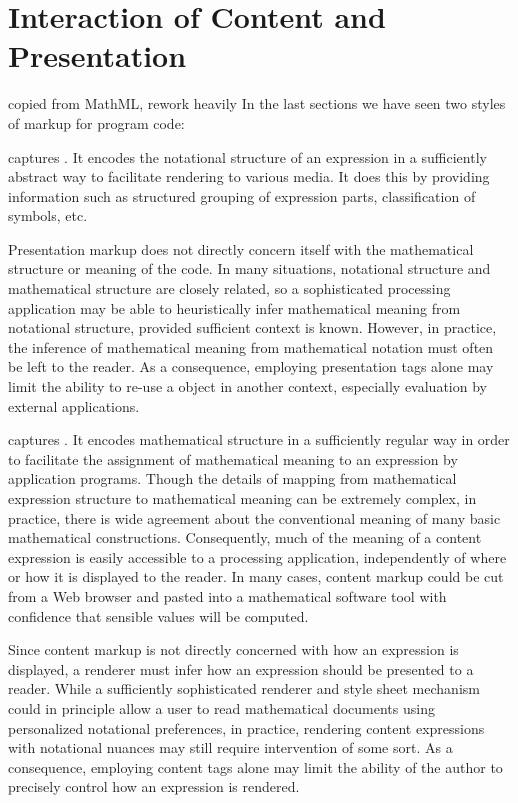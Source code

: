 \section{Interaction of Content and Presentation}\label{sec:integration}

\begin{newpart}{copied from MathML, rework heavily}
In the last sections we have seen two styles of markup for program code: 

{\em {}} captures
{}. It encodes the
notational structure of an expression in a sufficiently abstract way to facilitate
rendering to various media. It does this by providing information such as
structured grouping of expression parts, classification of symbols, etc.

Presentation markup does not directly concern itself with the mathematical
structure or meaning of the code. In many situations, notational structure and
mathematical structure are closely related, so a sophisticated processing
application may be able to heuristically infer mathematical meaning from
notational structure, provided sufficient context is known. However, in practice,
the inference of mathematical meaning from mathematical notation must often be
left to the reader. As a consequence, employing presentation tags alone may limit
the ability to re-use a {\codeml} object in another context, especially evaluation
by external applications.

{\em {}} captures {}. It encodes mathematical structure
in a sufficiently regular way in order to facilitate the assignment of
mathematical meaning to an expression by application programs.  Though the details
of mapping from mathematical expression structure to mathematical meaning can be
extremely complex, in practice, there is wide agreement about the conventional
meaning of many basic mathematical constructions.  Consequently, much of the
meaning of a content expression is easily accessible to a processing application,
independently of where or how it is displayed to the reader. In many cases,
content markup could be cut from a Web browser and pasted into a mathematical
software tool with confidence that sensible values will be computed.

Since content markup is not directly concerned with how an expression is
displayed, a renderer must infer how an expression should be presented to a
reader. While a sufficiently sophisticated renderer and style sheet mechanism
could in principle allow a user to read mathematical documents using personalized
notational preferences, in practice, rendering content expressions with notational
nuances may still require intervention of some sort. As a consequence, employing
content tags alone may limit the ability of the author to precisely control how an
expression is rendered.


\end{newpart}
